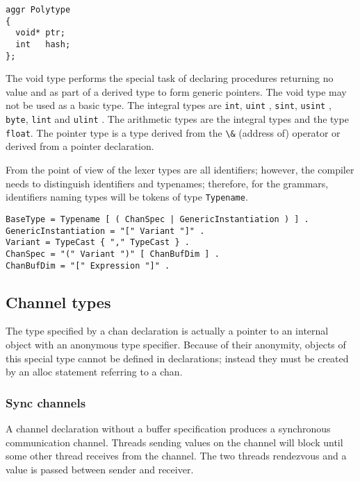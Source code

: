 \begin{lstlisting}
aggr Polytype 
{
  void* ptr;
  int   hash;
};
\end{lstlisting}

The void type performs the special task of declaring procedures
returning no value and as part of a derived type to form generic
pointers. The void type may not be used as a basic type. The integral
types are \passthrough{\lstinline!int!}, \passthrough{\lstinline!uint!}
, \passthrough{\lstinline!sint!}, \passthrough{\lstinline!usint!} ,
\passthrough{\lstinline!byte!}, \passthrough{\lstinline!lint!} and
\passthrough{\lstinline!ulint!} . The arithmetic types are the integral
types and the type \passthrough{\lstinline!float!}. The pointer type is
a type derived from the \passthrough{\lstinline!\&!} (address of)
operator or derived from a pointer declaration.

From the point of view of the lexer types are all identifiers; however, the compiler 
needs to distinguish identifiers and typenames; therefore, for the grammars, 
identifiers naming types will be tokens of type \passthrough{\lstinline!Typename!}.
\begin{lstlisting}
BaseType = Typename [ ( ChanSpec | GenericInstantiation ) ] .
GenericInstantiation = "[" Variant "]" . 
Variant = TypeCast { "," TypeCast } . 
ChanSpec = "(" Variant ")" [ ChanBufDim ] .  
ChanBufDim = "[" Expression "]" . 
\end{lstlisting}

\hypertarget{channel-types}{%
\subsection{Channel types}\label{channel-types}}

The type specified by a chan declaration is actually a pointer to an
internal object with an anonymous type specifier. Because of their
anonymity, objects of this special type cannot be defined in
declarations; instead they must be created by an alloc statement
referring to a chan.

\hypertarget{sync-channels}{%
\subsubsection{Sync channels}\label{sync-channels}}

A channel declaration without a buffer specification produces a
synchronous communication channel. Threads sending values on the channel
will block until some other thread receives from the channel. The two
threads rendezvous and a value is passed between sender and receiver.

